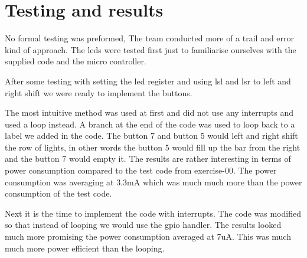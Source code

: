 \section{Testing and results}
No formal testing was preformed, The team conducted more of a trail and error kind of approach.
The leds were tested first just to familiarise ourselves with the supplied code and the micro controller.

After some testing with setting the led register and using lsl and lsr to left and right shift we were ready to implement the buttons.

The most intuitive method was used at first and did not use any interrupts and used a loop instead.
A branch at the end of the code was used to loop back to a label we added in the code.
The button 7 and button 5 would left and right shift the row of lights, in other words the button 5 would fill up the bar from the right and the button 7 would empty it.
The results are rather interesting in terms of power consumption compared to the test code from exercise-00.
The power consumption was averaging at 3.3mA which was much much more than the power consumption of the test code.

Next it is the time to implement the code with interrupts.
The code was modified so that instead of looping we would use the gpio handler.
The results looked much more promising the power consumption averaged at 7uA.
This was much much more power efficient than the looping.
